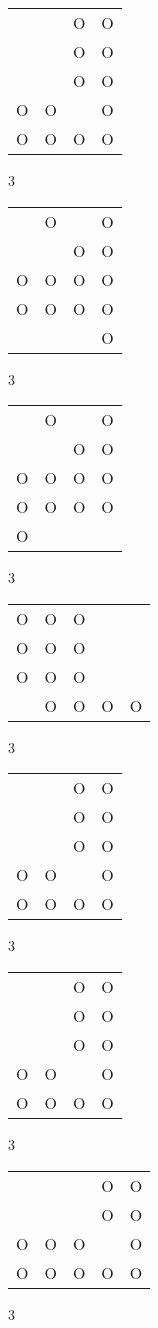 \begin{tabular}{|m{0.2cm}m{0.2cm}m{0.2cm}m{0.2cm}|}\hline
 & &O&O\\
 & &O&O\\
 & &O&O\\
O&O& &O\\
O&O&O&O\\
\hline\end{tabular}3
\begin{tabular}{|m{0.2cm}m{0.2cm}m{0.2cm}m{0.2cm}|}\hline
 &O& &O\\
 & &O&O\\
O&O&O&O\\
O&O&O&O\\
 & & &O\\
\hline\end{tabular}3
\begin{tabular}{|m{0.2cm}m{0.2cm}m{0.2cm}m{0.2cm}|}\hline
 &O& &O\\
 & &O&O\\
O&O&O&O\\
O&O&O&O\\
O& & & \\
\hline\end{tabular}3
\begin{tabular}{|m{0.2cm}m{0.2cm}m{0.2cm}m{0.2cm}m{0.2cm}|}\hline
O&O&O& & \\
O&O&O& & \\
O&O&O& & \\
 &O&O&O&O\\
\hline\end{tabular}3
\begin{tabular}{|m{0.2cm}m{0.2cm}m{0.2cm}m{0.2cm}|}\hline
 & &O&O\\
 & &O&O\\
 & &O&O\\
O&O& &O\\
O&O&O&O\\
\hline\end{tabular}3
\begin{tabular}{|m{0.2cm}m{0.2cm}m{0.2cm}m{0.2cm}|}\hline
 & &O&O\\
 & &O&O\\
 & &O&O\\
O&O& &O\\
O&O&O&O\\
\hline\end{tabular}3
\begin{tabular}{|m{0.2cm}m{0.2cm}m{0.2cm}m{0.2cm}m{0.2cm}|}\hline
 & & &O&O\\
 & & &O&O\\
O&O&O& &O\\
O&O&O&O&O\\
\hline\end{tabular}3
